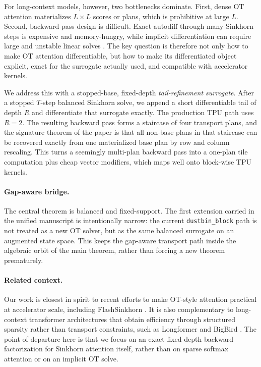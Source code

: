 \documentclass{article}
\begin{document}
For long-context models, however, two bottlenecks dominate. First, dense OT attention materializes $L\times L$ scores or plans, which is prohibitive at large $L$. Second, backward-pass design is difficult. Exact autodiff through many Sinkhorn steps is expensive and memory-hungry, while implicit differentiation can require large and unstable linear solves \citep{luise2018differential, bai2019deep}. The key question is therefore not only how to make OT attention differentiable, but how to make its differentiated object explicit, exact for the surrogate actually used, and compatible with accelerator kernels.

We address this with a stopped-base, fixed-depth \emph{tail-refinement surrogate}. After a stopped $T$-step balanced Sinkhorn solve, we append a short differentiable tail of depth $R$ and differentiate that surrogate exactly. The production TPU path uses $R=2$. The resulting backward pass forms a staircase of four transport plans, and the signature theorem of the paper is that all non-base plans in that staircase can be recovered exactly from one materialized base plan by row and column rescaling. This turns a seemingly multi-plan backward pass into a one-plan tile computation plus cheap vector modifiers, which maps well onto block-wise TPU kernels.

\paragraph{Gap-aware bridge.}
The central theorem is balanced and fixed-support. The first extension carried in the unified manuscript is intentionally narrow: the current \texttt{dustbin\_block} path is not treated as a new OT solver, but as the same balanced surrogate on an augmented state space. This keeps the gap-aware transport path inside the algebraic orbit of the main theorem, rather than forcing a new theorem prematurely.

\paragraph{Related context.}
Our work is closest in spirit to recent efforts to make OT-style attention practical at accelerator scale, including FlashSinkhorn \citep{flashsinkhorn2024}. It is also complementary to long-context transformer architectures that obtain efficiency through structured sparsity rather than transport constraints, such as Longformer \citep{beltagy2020longformer} and BigBird \citep{zaheer2020bigbird}. The point of departure here is that we focus on an exact fixed-depth backward factorization for Sinkhorn attention itself, rather than on sparse softmax attention or on an implicit OT solve.
\end{document}
